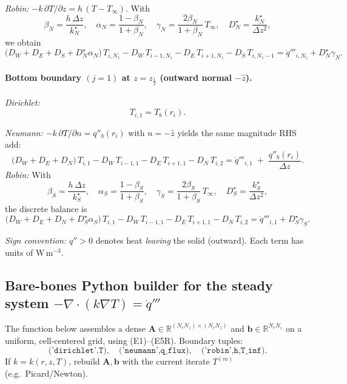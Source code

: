 \documentclass[11pt]{article}
\begin{document}
\emph{Robin:} \(-k\,\partial T/\partial z=h\,(T-T_\infty)\). With
\begin{equation}
\beta_N=\frac{h\,\Delta z}{k_N^{\star}},\quad
\alpha_N=\frac{1-\beta_N}{1+\beta_N},\quad
\gamma_N=\frac{2\beta_N}{1+\beta_N}\,T_\infty,\quad
D_N^{\star}=\frac{k_N^{\star}}{\Delta z^2},
\end{equation}
we obtain
\begin{equation}\tag{E4R}
\big(D_W{+}D_E{+}D_S{+}D_N^{\star}\alpha_N\big)\,T_{i,N_z}
- D_W\,T_{i-1,N_z}
- D_E\,T_{i+1,N_z}
- D_S\,T_{i,N_z-1}
= \dot q'''_{i,N_z} + D_N^{\star}\gamma_N.
\end{equation}

\paragraph{Bottom boundary \((j=1)\) at \(z=z_{\frac12}\) (outward normal \(-\hat z\)).}
\emph{Dirichlet:} 
\begin{equation}
\tag{E5D}
 T_{i,1}=T_b(r_i).
\end{equation}



\emph{Neumann:} \(-k\,\partial T/\partial n=q''_b(r_i)\) with \(n=-\hat z\) yields the same magnitude RHS add:
\begin{equation}\tag{E5N}
\big(D_W{+}D_E{+}D_N\big)\,T_{i,1}
- D_W\,T_{i-1,1}
- D_E\,T_{i+1,1}
- D_N\,T_{i,2}
= \dot q'''_{i,1} \;+\; \frac{q''_b(r_i)}{\Delta z}.
\end{equation}
\emph{Robin:} With
\begin{equation}
\beta_S=\frac{h\,\Delta z}{k_S^{\star}},\quad
\alpha_S=\frac{1-\beta_S}{1+\beta_S},\quad
\gamma_S=\frac{2\beta_S}{1+\beta_S}\,T_\infty,\quad
D_S^{\star}=\frac{k_S^{\star}}{\Delta z^2},
\end{equation}
the discrete balance is
\begin{equation}\tag{E5R}
\big(D_W{+}D_E{+}D_N{+}D_S^{\star}\alpha_S\big)\,T_{i,1}
- D_W\,T_{i-1,1}
- D_E\,T_{i+1,1}
- D_N\,T_{i,2}
= \dot q'''_{i,1} + D_S^{\star}\gamma_S.
\end{equation}

\noindent\textit{Sign convention:} \(q''>0\) denotes heat \emph{leaving} the solid (outward). Each term has units of W\,m\(^{-3}\).

\subsection*{Bare-bones Python builder for the steady system \(-\nabla\!\cdot(k\nabla T)=\dot q'''\)}
The function below assembles a dense \(\mathbf{A}\in\mathbb{R}^{(N_rN_z)\times(N_rN_z)}\) and \(\mathbf{b}\in\mathbb{R}^{N_rN_z}\) on a uniform, cell-centered grid, using (E1)--(E5R). Boundary tuples:
\[
\texttt{('dirichlet',T)},\quad
\texttt{('neumann',q\_flux)},\quad
\texttt{('robin',h,T\_inf)}.
\]
If \(k=k(r,z,T)\), rebuild \(\mathbf{A},\mathbf{b}\) with the current iterate \(T^{(m)}\) (e.g.\ Picard/Newton).
\end{document}
